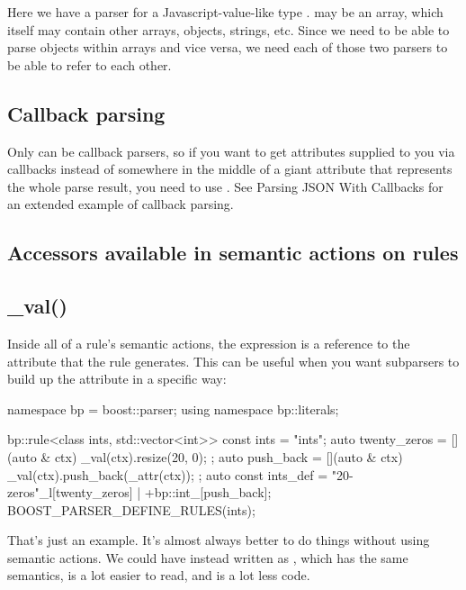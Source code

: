 \documentclass{MyBook}
\begin{document}
Here we have a parser for a Javascript-value-like type .  may be an array, which itself may contain other arrays, objects, strings, etc. Since we need to be able to parse objects within arrays and vice versa, we need each of those two parsers to be able to refer to each other.

\subsection{Callback parsing}

Only  can be callback parsers, so if you want to get attributes supplied to you via callbacks instead of somewhere in the middle of a giant attribute that represents the whole parse result, you need to use . See Parsing JSON With Callbacks for an extended example of callback parsing.

\subsection{Accessors available in semantic actions on rules}

\subsection{\_val()}

Inside all of a rule's semantic actions, the expression  is a reference to the attribute that the rule generates. This can be useful when you want subparsers to build up the attribute in a specific way:

\begin{code}
namespace bp = boost::parser;
using namespace bp::literals;

bp::rule<class ints, std::vector<int>> const ints = "ints";
auto twenty_zeros = [](auto & ctx) { _val(ctx).resize(20, 0); };
auto push_back = [](auto & ctx) { _val(ctx).push_back(_attr(ctx)); };
auto const ints_def = "20-zeros"_l[twenty_zeros] | +bp::int_[push_back];
BOOST_PARSER_DEFINE_RULES(ints);
\end{code}

\begin{marker}[title=Tip ]
That's just an example. It's almost always better to do things without using semantic actions. We could have instead written  as , which has the same semantics, is a lot easier to read, and is a lot less code. 
\end{marker}
\end{document}
